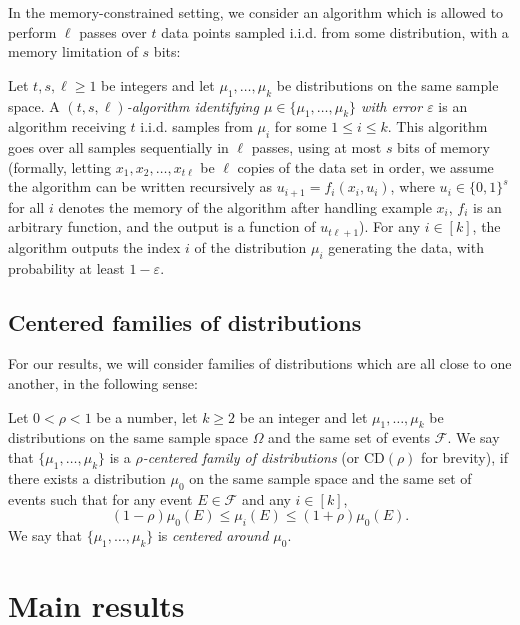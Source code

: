 \documentclass[final, 12pt]{colt2018}
\providecommand{\CD}{\mathrm{CD}}
\begin{document}
In the memory-constrained setting, we consider an algorithm which is allowed to perform $\ell$ passes over $t$ data points sampled i.i.d. from some distribution, with a memory limitation of $s$ bits:
\begin{definition}
Let $t,s, \ell\ge 1$ be integers and let $\mu_1, \dots, \mu_k$ be distributions on the same sample space.
A \emph{$(t,s,\ell)$-algorithm identifying $\mu \in \{\mu_1, \dots, \mu_k\}$ with error $\varepsilon$} is an algorithm receiving $t$ i.i.d. samples from $\mu_i$ for some $1 \le i \le k$. This algorithm goes over all samples sequentially in $\ell$ passes, using at most $s$ bits of memory (formally, letting $x_1,x_2,\ldots,x_{t\ell}$ be $\ell$ copies of the data set in order, we assume the algorithm can be written recursively as $u_{i+1}=f_i(x_i,u_{i})$, where $u_i\in \{0,1\}^s$ for all $i$ denotes the memory of the algorithm after handling example $x_i$, $f_i$ is an arbitrary function, and the output is a function of $u_{t\ell+1}$). For any $i\in [k]$, the algorithm outputs the index $i$ of the distribution $\mu_i$ generating the data, with probability at least $1-\varepsilon$.
\end{definition}

\subsection{Centered families of distributions}

For our results, we will consider families of distributions which are all close to one another, in the following sense:

\begin{definition}\label{def:cd}
Let $0 < \rho < 1$ be a number, let $k \ge 2$ be an integer and let $\mu_1, \dots, \mu_k$ be distributions on the same sample space $\Omega$ and the same set of events $\mathcal{F}$. We say that $\{\mu_1, \dots, \mu_k \}$ is a \emph{$\rho$-centered family of distributions} (or $\CD(\rho)$ for brevity), if there exists a distribution $\mu_0$ on the same sample space and the same set of events such that for any event $E \in \mathcal{F}$ and any $i \in [k]$,
\[
(1 - \rho) \mu_0(E) \le \mu_i(E) \le (1 + \rho) \mu_0(E).
\]
We say that $\{ \mu_1, \dots, \mu_k \}$ is \emph{centered around $\mu_0$}.
\end{definition}

\section{Main results}\label{sec:main}
\end{document}
